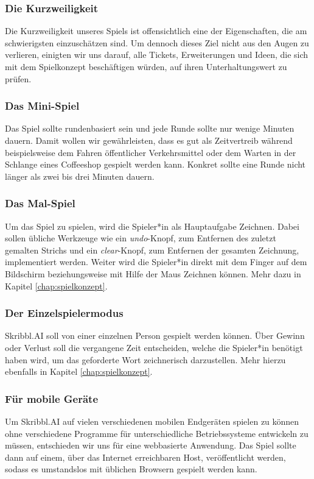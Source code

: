 \documentclass[11pt]{article}
\begin{document}
\subsubsection{Die Kurzweiligkeit}
Die Kurzweiligkeit unseres Spiels ist offensichtlich eine der Eigenschaften, die am schwierigsten einzuschätzen sind. Um dennoch dieses Ziel nicht aus den Augen zu verlieren, einigten wir uns darauf, alle Tickets, Erweiterungen und Ideen, die sich mit dem Spielkonzept beschäftigen würden, auf ihren Unterhaltungswert zu prüfen.
\subsubsection{Das Mini-Spiel}
Das Spiel sollte rundenbasiert sein und jede Runde sollte nur wenige Minuten dauern. Damit wollen wir gewährleisten, dass es gut als Zeitvertreib während beispielsweise dem Fahren öffentlicher Verkehrsmittel oder dem Warten in der Schlange eines Coffeeshop gespielt werden kann. Konkret sollte eine Runde nicht länger als zwei bis drei Minuten dauern.
\subsubsection{Das Mal-Spiel}
Um das Spiel zu spielen, wird die Spieler*in als Hauptaufgabe Zeichnen. Dabei sollen übliche Werkzeuge wie ein \textit{undo}-Knopf, zum Entfernen des zuletzt gemalten Strichs und ein \textit{clear}-Knopf, zum Entfernen der gesamten Zeichnung, implementiert werden. Weiter wird die Spieler*in direkt mit dem Finger auf dem Bildschirm beziehungsweise mit Hilfe der Maus Zeichnen können. Mehr dazu in Kapitel \ref{chap:spielkonzept}.
\subsubsection{Der Einzelspielermodus}
Skribbl.AI soll von einer einzelnen Person gespielt werden können. Über Gewinn oder Verlust soll die vergangene Zeit entscheiden, welche die Spieler*in benötigt haben wird, um das geforderte Wort zeichnerisch darzustellen. Mehr hierzu ebenfalls in Kapitel \ref{chap:spielkonzept}.
\subsubsection{Für mobile Geräte}
Um Skribbl.AI auf vielen verschiedenen mobilen Endgeräten spielen zu können ohne verschiedene Programme für unterschiedliche Betriebssysteme entwickeln zu müssen, entschieden wir uns für eine webbasierte Anwendung. Das Spiel sollte dann auf einem, über das Internet erreichbaren Host, veröffentlicht werden, sodass es umstandslos mit üblichen Browsern gespielt werden kann.
\end{document}
